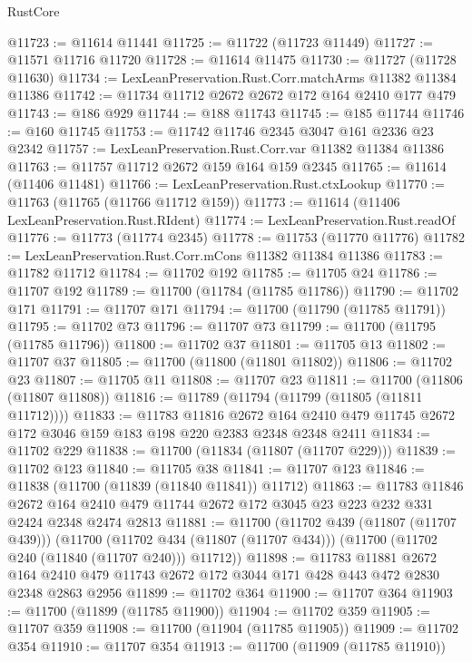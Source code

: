 \begin{lexlean}{RustCore}
\begin{coremodule}
@11723 := @11614 @11441
@11725 := @11722 (@11723 @11449)
@11727 := @11571 @11716 @11720
@11728 := @11614 @11475
@11730 := @11727 (@11728 @11630)
@11734 := LexLeanPreservation.Rust.Corr.matchArms @11382 @11384 @11386
@11742 := @11734 @11712 @2672 @2672 @172 @164 @2410 @177 @479
@11743 := @186 @929
@11744 := @188 @11743
@11745 := @185 @11744
@11746 := @160 @11745
@11753 := @11742 @11746 @2345 @3047 @161 @2336 @23 @2342
@11757 := LexLeanPreservation.Rust.Corr.var @11382 @11384 @11386
@11763 := @11757 @11712 @2672 @159 @164 @159 @2345
@11765 := @11614 (@11406 @11481)
@11766 := LexLeanPreservation.Rust.ctxLookup
@11770 := @11763 (@11765 (@11766 @11712 @159))
@11773 := @11614 (@11406 LexLeanPreservation.Rust.RIdent)
@11774 := LexLeanPreservation.Rust.readOf
@11776 := @11773 (@11774 @2345)
@11778 := @11753 (@11770 @11776)
@11782 := LexLeanPreservation.Rust.Corr.mCons @11382 @11384 @11386
@11783 := @11782 @11712
@11784 := @11702 @192
@11785 := @11705 @24
@11786 := @11707 @192
@11789 := @11700 (@11784 (@11785 @11786))
@11790 := @11702 @171
@11791 := @11707 @171
@11794 := @11700 (@11790 (@11785 @11791))
@11795 := @11702 @73
@11796 := @11707 @73
@11799 := @11700 (@11795 (@11785 @11796))
@11800 := @11702 @37
@11801 := @11705 @13
@11802 := @11707 @37
@11805 := @11700 (@11800 (@11801 @11802))
@11806 := @11702 @23
@11807 := @11705 @11
@11808 := @11707 @23
@11811 := @11700 (@11806 (@11807 @11808))
@11816 := @11789 (@11794 (@11799 (@11805 (@11811 @11712))))
@11833 := @11783
    @11816
    @2672
    @164
    @2410
    @479
    @11745
    @2672
    @172
    @3046
    @159
    @183
    @198
    @220
    @2383
    @2348
    @2348
    @2411
@11834 := @11702 @229
@11838 := @11700 (@11834 (@11807 (@11707 @229)))
@11839 := @11702 @123
@11840 := @11705 @38
@11841 := @11707 @123
@11846 := @11838 (@11700 (@11839 (@11840 @11841)) @11712)
@11863 := @11783
    @11846
    @2672
    @164
    @2410
    @479
    @11744
    @2672
    @172
    @3045
    @23
    @223
    @232
    @331
    @2424
    @2348
    @2474
    @2813
@11881 := @11700
    (@11702 @439 (@11807 (@11707 @439)))
    (@11700
      (@11702 @434 (@11807 (@11707 @434)))
      (@11700 (@11702 @240 (@11840 (@11707 @240))) @11712))
@11898 := @11783
    @11881
    @2672
    @164
    @2410
    @479
    @11743
    @2672
    @172
    @3044
    @171
    @428
    @443
    @472
    @2830
    @2348
    @2863
    @2956
@11899 := @11702 @364
@11900 := @11707 @364
@11903 := @11700 (@11899 (@11785 @11900))
@11904 := @11702 @359
@11905 := @11707 @359
@11908 := @11700 (@11904 (@11785 @11905))
@11909 := @11702 @354
@11910 := @11707 @354
@11913 := @11700 (@11909 (@11785 @11910))

\end{coremodule}
\end{lexlean}
